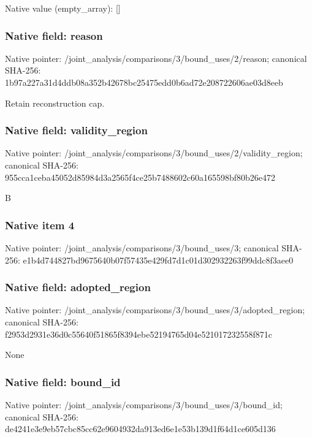 \documentclass[10pt,a4paper]{article}
\begin{document}
Native value (empty\_\allowbreak{}array): []

\subsubsection{Native field: reason}
Native pointer: /joint\_\allowbreak{}analysis/comparisons/3/bound\_\allowbreak{}uses/2/reason; canonical SHA-256: 1b97a227a31d4ddb08a352b42678bc25475edd0b6ad72e208722606ae03d8eeb

\begingroup\raggedright\sloppy Retain reconstruction cap.\par\endgroup

\subsubsection{Native field: validity\_\allowbreak{}region}
Native pointer: /joint\_\allowbreak{}analysis/comparisons/3/bound\_\allowbreak{}uses/2/validity\_\allowbreak{}region; canonical SHA-256: 955cca1ceba45052d85984d3a2565f4ce25b7488602c60a165598bf80b26e472

\begingroup\raggedright\sloppy B\par\endgroup

\subsubsection{Native item 4}
Native pointer: /joint\_\allowbreak{}analysis/comparisons/3/bound\_\allowbreak{}uses/3; canonical SHA-256: e1b4d744827bd9675640b07f57435e429fd7d1c01d302932263f99ddc8f3aee0

\subsubsection{Native field: adopted\_\allowbreak{}region}
Native pointer: /joint\_\allowbreak{}analysis/comparisons/3/bound\_\allowbreak{}uses/3/adopted\_\allowbreak{}region; canonical SHA-256: f2953d2931e36d0c55640f51865f8394ebe52194765d04e521017232558f871c

\begingroup\raggedright\sloppy None\par\endgroup

\subsubsection{Native field: bound\_\allowbreak{}id}
Native pointer: /joint\_\allowbreak{}analysis/comparisons/3/bound\_\allowbreak{}uses/3/bound\_\allowbreak{}id; canonical SHA-256: de4241e3e9eb57cbc85cc62e9604932da913ed6e1e53b139d1f64d1ce605d136
\end{document}
